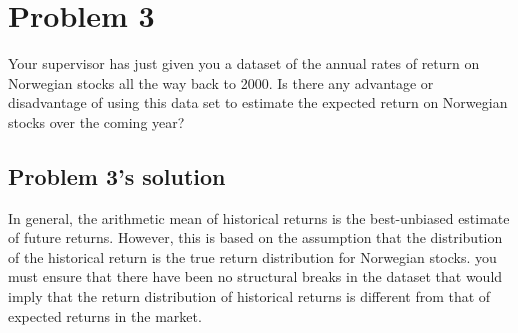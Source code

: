 \documentclass[10]{article}
\begin{document}
\color{black}
\section*{Problem 3}
Your supervisor has just given you a dataset of the annual rates of return on Norwegian stocks all the way back to 2000. Is there any advantage or disadvantage of using this data set to estimate the expected return on Norwegian stocks over the coming year?

\color{blue}
\subsection*{Problem 3's solution}
In general, the arithmetic mean of historical returns is the best-unbiased estimate of future returns. However, this is based on the assumption that the distribution of the historical return is the true return distribution for Norwegian stocks.
you must ensure that there have been no structural breaks in the dataset that would imply that the return distribution of historical returns is different from that of expected returns in the market.




\color{black}
\end{document}
